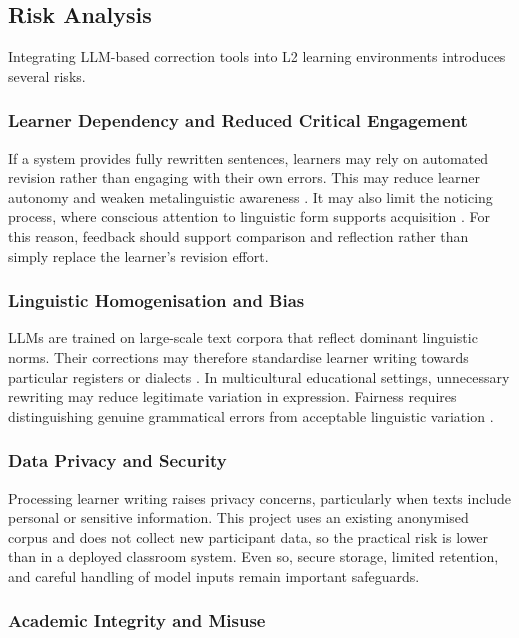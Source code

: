 \subsection{Risk Analysis}

Integrating LLM-based correction tools into L2 learning environments introduces several risks.

\subsubsection{Learner Dependency and Reduced Critical Engagement}

If a system provides fully rewritten sentences, learners may rely on automated revision rather than engaging with their own errors. This may reduce learner autonomy and weaken metalinguistic awareness \cite{ke2019automated}. It may also limit the noticing process, where conscious attention to linguistic form supports acquisition \cite{schmidt1990role}. For this reason, feedback should support comparison and reflection rather than simply replace the learner's revision effort.

\subsubsection{Linguistic Homogenisation and Bias}

LLMs are trained on large-scale text corpora that reflect dominant linguistic norms. Their corrections may therefore standardise learner writing towards particular registers or dialects \cite{NEURIPS2020_1457c0d6}. In multicultural educational settings, unnecessary rewriting may reduce legitimate variation in expression. Fairness requires distinguishing genuine grammatical errors from acceptable linguistic variation \cite{floridi2018ai4people}.

\subsubsection{Data Privacy and Security}

Processing learner writing raises privacy concerns, particularly when texts include personal or sensitive information. This project uses an existing anonymised corpus and does not collect new participant data, so the practical risk is lower than in a deployed classroom system. Even so, secure storage, limited retention, and careful handling of model inputs remain important safeguards.

\subsubsection{Academic Integrity and Misuse}

